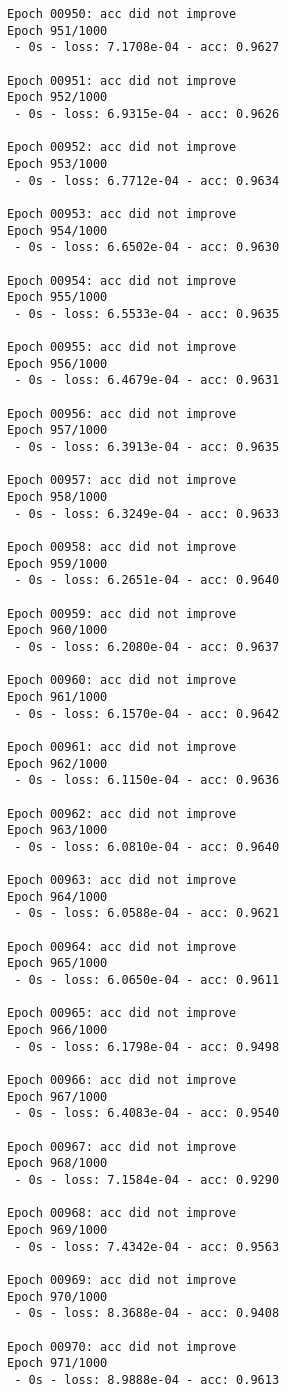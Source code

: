 \documentclass[11pt]{article}
\begin{document}
\begin{Verbatim}[commandchars=\\\{\}]
Epoch 00950: acc did not improve
Epoch 951/1000
 - 0s - loss: 7.1708e-04 - acc: 0.9627

Epoch 00951: acc did not improve
Epoch 952/1000
 - 0s - loss: 6.9315e-04 - acc: 0.9626

Epoch 00952: acc did not improve
Epoch 953/1000
 - 0s - loss: 6.7712e-04 - acc: 0.9634

Epoch 00953: acc did not improve
Epoch 954/1000
 - 0s - loss: 6.6502e-04 - acc: 0.9630

Epoch 00954: acc did not improve
Epoch 955/1000
 - 0s - loss: 6.5533e-04 - acc: 0.9635

Epoch 00955: acc did not improve
Epoch 956/1000
 - 0s - loss: 6.4679e-04 - acc: 0.9631

Epoch 00956: acc did not improve
Epoch 957/1000
 - 0s - loss: 6.3913e-04 - acc: 0.9635

Epoch 00957: acc did not improve
Epoch 958/1000
 - 0s - loss: 6.3249e-04 - acc: 0.9633

Epoch 00958: acc did not improve
Epoch 959/1000
 - 0s - loss: 6.2651e-04 - acc: 0.9640

Epoch 00959: acc did not improve
Epoch 960/1000
 - 0s - loss: 6.2080e-04 - acc: 0.9637

Epoch 00960: acc did not improve
Epoch 961/1000
 - 0s - loss: 6.1570e-04 - acc: 0.9642

Epoch 00961: acc did not improve
Epoch 962/1000
 - 0s - loss: 6.1150e-04 - acc: 0.9636

Epoch 00962: acc did not improve
Epoch 963/1000
 - 0s - loss: 6.0810e-04 - acc: 0.9640

Epoch 00963: acc did not improve
Epoch 964/1000
 - 0s - loss: 6.0588e-04 - acc: 0.9621

Epoch 00964: acc did not improve
Epoch 965/1000
 - 0s - loss: 6.0650e-04 - acc: 0.9611

Epoch 00965: acc did not improve
Epoch 966/1000
 - 0s - loss: 6.1798e-04 - acc: 0.9498

Epoch 00966: acc did not improve
Epoch 967/1000
 - 0s - loss: 6.4083e-04 - acc: 0.9540

Epoch 00967: acc did not improve
Epoch 968/1000
 - 0s - loss: 7.1584e-04 - acc: 0.9290

Epoch 00968: acc did not improve
Epoch 969/1000
 - 0s - loss: 7.4342e-04 - acc: 0.9563

Epoch 00969: acc did not improve
Epoch 970/1000
 - 0s - loss: 8.3688e-04 - acc: 0.9408

Epoch 00970: acc did not improve
Epoch 971/1000
 - 0s - loss: 8.9888e-04 - acc: 0.9613


\end{Verbatim}
\end{document}
